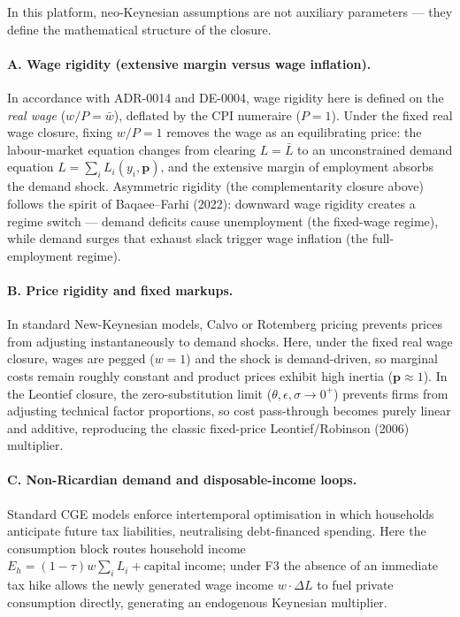 In this platform, neo-Keynesian assumptions are not auxiliary parameters ---
they define the mathematical structure of the closure.

\paragraph{A. Wage rigidity (extensive margin versus wage inflation).}
In accordance with ADR-0014 and DE-0004, wage rigidity here is defined on the
\emph{real wage} ($w/P = \bar w$), deflated by the CPI numeraire ($P = 1$).
Under the fixed real wage closure, fixing $w/P = 1$ removes the wage as an
equilibrating price: the
labour-market equation changes from clearing $L = \bar L$ to an unconstrained
demand equation $L = \sum_i L_i(y_i, \mathbf{p})$, and the extensive margin of
employment absorbs the demand shock. Asymmetric rigidity (the complementarity
closure above) follows the
spirit of Baqaee--Farhi (2022): downward wage rigidity creates a regime
switch --- demand deficits cause unemployment (the fixed-wage regime), while
demand
surges that exhaust slack trigger wage inflation (the full-employment regime).

\paragraph{B. Price rigidity and fixed markups.} In standard New-Keynesian
models, Calvo or Rotemberg pricing prevents prices from adjusting
instantaneously to demand shocks. Here, under the fixed real wage closure,
wages are pegged
($w = 1$) and the shock is demand-driven, so marginal costs remain roughly
constant and product prices exhibit high inertia ($\mathbf{p} \approx 1$). In
the Leontief closure, the zero-substitution limit
($\theta, \epsilon, \sigma \to 0^+$)
prevents firms from adjusting technical factor proportions, so cost
pass-through becomes purely linear and additive, reproducing the classic
fixed-price Leontief/Robinson (2006) multiplier.

\paragraph{C. Non-Ricardian demand and disposable-income loops.} Standard CGE
models enforce intertemporal optimisation in which households anticipate
future tax liabilities, neutralising debt-financed spending. Here the
consumption block routes household income $E_h = (1-\tau) w \sum_i L_i +
\text{capital income}$; under F3 the absence of an immediate tax hike allows
the newly generated wage income $w\cdot\Delta L$ to fuel private consumption
directly, generating an endogenous Keynesian multiplier.

